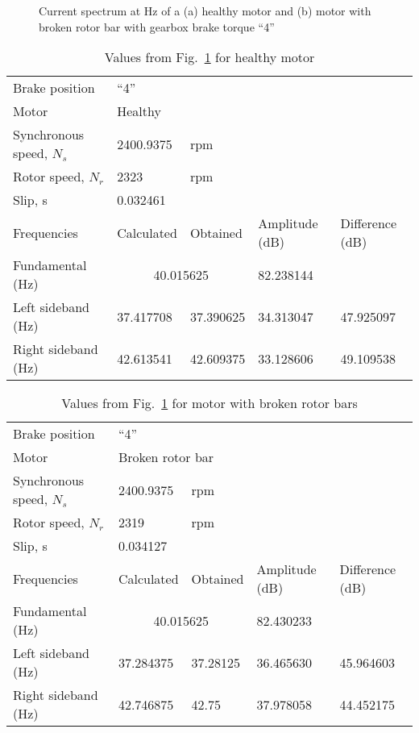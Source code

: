 \documentclass[a4paper,11pt]{report}
\begin{document}
\begin{figure}[htbp]
\centering
\subfigure[]{\texttt{[image: h440]}}
\subfigure[]{\texttt{[image: b440]}}
\caption{Current spectrum at \unit[40]{Hz} of a (a) healthy motor and (b) motor with broken rotor bar with gearbox brake torque ``4''} \label{hb440ss}
\end{figure}

\begin{table}[h]
\centering
\begin{tabular}{lllll}
Brake position	& ``4'' & & & \\			
Motor &	\multicolumn{4}{l}{Healthy} \\ 
Synchronous speed, $N_{s}$	&2400.9375 & rpm & & \\			
Rotor speed, $N_{r}$ 	  	& 2323	& rpm& & \\		
Slip, s			  	&  \multicolumn{4}{l}{0.032461} \\			
Frequencies 		  	& Calculated & Obtained & Amplitude (dB) & Difference (dB) \\
Fundamental (Hz)		& \multicolumn{2}{c}{40.015625}	& 82.238144 &  \\ 
Left sideband (Hz) 		& 37.417708 & 37.390625 & 34.313047 & 47.925097\\
Right sideband (Hz)		& 42.613541 & 42.609375 & 33.128606 & 49.109538 
\end{tabular}
\caption{Values from Fig.~\ref{hb440ss} for healthy motor} \label{h440sst}
\end{table}

\begin{table}[h]
\centering
\begin{tabular}{lllll}
Brake position	& ``4'' & & & \\			
Motor &	\multicolumn{4}{l}{Broken rotor	bar} \\ 
Synchronous speed, $N_{s}$	& 2400.9375	& rpm & & \\			
Rotor speed, $N_{r}$ 	  	& 2319	& rpm& & \\		
Slip, s			  	&  \multicolumn{4}{l}{0.034127} \\			
Frequencies 		  	& Calculated & Obtained & Amplitude (dB) & Difference (dB) \\
Fundamental (Hz)		& \multicolumn{2}{c}{40.015625 }& 82.430233 &  \\ 
Left sideband (Hz) 		& 37.284375 & 37.28125 & 36.465630 & 45.964603 \\
Right sideband (Hz)		&  42.746875 & 42.75 &   37.978058 & 44.452175
\end{tabular}
\caption{Values from Fig.~\ref{hb440ss} for motor with broken rotor bars} \label{b440sst}
\end{table}
\end{document}
